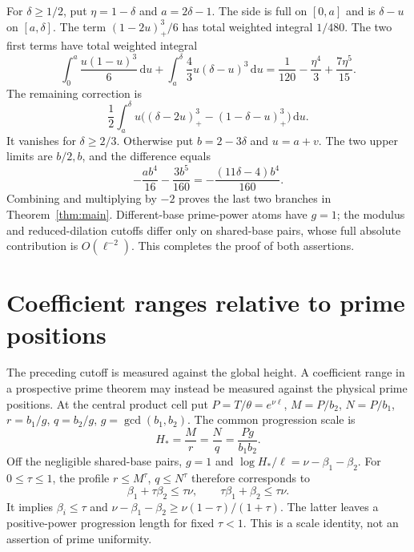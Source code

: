\documentclass[11pt]{article}
\newcommand{\dd}{\,\mathrm d}
\begin{document}
For $\delta\geq1/2$, put $\eta=1-\delta$ and $a=2\delta-1$.
The side is full on $[0,a]$ and is $\delta-u$ on $[a,\delta]$.
The term $(1-2u)_+^3/6$ has total weighted integral $1/480$.
The two first terms have total weighted integral
\[
 \int_0^a \frac{u(1-u)^3}{6}\dd u
 +\int_a^\delta \frac43u(\delta-u)^3\dd u
 =\frac1{120}-\frac{\eta^4}{3}+\frac{7\eta^5}{15}.
\]
The remaining correction is
\[
 \frac12\int_a^\delta u\bigl((\delta-2u)_+^3
                           -(1-\delta-u)_+^3\bigr)\dd u.
\]
It vanishes for $\delta\geq2/3$. Otherwise put $b=2-3\delta$ and
$u=a+v$. The two upper limits are $b/2,b$, and the difference equals
\[
 -\frac{ab^4}{16}-\frac{3b^5}{160}
 =-\frac{(11\delta-4)b^4}{160}.
\]
Combining and multiplying by $-2$ proves the last two branches in
Theorem~\ref{thm:main}. Different-base prime-power atoms have $g=1$;
the modulus and reduced-dilation cutoffs differ only on shared-base
pairs, whose full absolute contribution is $O(\ell^{-2})$.
This completes the proof of both assertions.

\section{Coefficient ranges relative to prime positions}
The preceding cutoff is measured against the global height.
A coefficient range in a prospective prime theorem may instead be
measured against the physical prime positions.
At the central product cell put $P=T/\theta=e^{\nu\ell}$,
$M=P/b_2$, $N=P/b_1$, $r=b_1/g$, $q=b_2/g$,
$g=\gcd(b_1,b_2)$. The common progression scale is
\[
 H_*=\frac Mr=\frac Nq=\frac{Pg}{b_1b_2}.
\]
Off the negligible shared-base pairs, $g=1$ and
$\log H_*/\ell=\nu-\beta_1-\beta_2$.
For $0\leq\tau\leq1$, the profile $r\leq M^\tau$, $q\leq N^\tau$
therefore corresponds to
\[
 \beta_1+\tau\beta_2\leq\tau\nu,\qquad
 \tau\beta_1+\beta_2\leq\tau\nu.
\]
It implies $\beta_i\leq\tau$ and
$\nu-\beta_1-\beta_2\geq\nu(1-\tau)/(1+\tau)$.
The latter leaves a positive-power progression length for fixed $\tau<1$.
This is a scale identity, not an assertion of prime uniformity.
\end{document}
